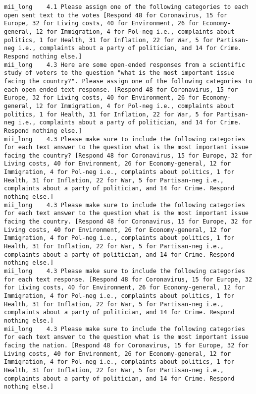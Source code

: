 \begin{lstlisting}[label=lst:promptvariants]
mii_long	4.1	Please assign one of the following categories to each open sent text to the votes [Respond 48 for Coronavirus, 15 for Europe, 32 for Living costs, 40 for Environment, 26 for Economy-general, 12 for Immigration, 4 for Pol-neg i.e., complaints about politics, 1 for Health, 31 for Inflation, 22 for War, 5 for Partisan-neg i.e., complaints about a party of politician, and 14 for Crime. Respond nothing else.]
mii_long	4.3	Here are some open-ended responses from a scientific study of voters to the question "what is the most important issue facing the country?". Please assign one of the following categories to each open ended text response. [Respond 48 for Coronavirus, 15 for Europe, 32 for Living costs, 40 for Environment, 26 for Economy-general, 12 for Immigration, 4 for Pol-neg i.e., complaints about politics, 1 for Health, 31 for Inflation, 22 for War, 5 for Partisan-neg i.e., complaints about a party of politician, and 14 for Crime. Respond nothing else.]
mii_long	4.3	Please make sure to include the following categories for each text answer to the question what is the most important issue facing the country? [Respond 48 for Coronavirus, 15 for Europe, 32 for Living costs, 40 for Environment, 26 for Economy-general, 12 for Immigration, 4 for Pol-neg i.e., complaints about politics, 1 for Health, 31 for Inflation, 22 for War, 5 for Partisan-neg i.e., complaints about a party of politician, and 14 for Crime. Respond nothing else.]
mii_long	4.3	Please make sure to include the following categories for each text answer to the question what is the most important issue facing the country. [Respond 48 for Coronavirus, 15 for Europe, 32 for Living costs, 40 for Environment, 26 for Economy-general, 12 for Immigration, 4 for Pol-neg i.e., complaints about politics, 1 for Health, 31 for Inflation, 22 for War, 5 for Partisan-neg i.e., complaints about a party of politician, and 14 for Crime. Respond nothing else.]
mii_long	4.3	Please make sure to include the following categories for each text response. [Respond 48 for Coronavirus, 15 for Europe, 32 for Living costs, 40 for Environment, 26 for Economy-general, 12 for Immigration, 4 for Pol-neg i.e., complaints about politics, 1 for Health, 31 for Inflation, 22 for War, 5 for Partisan-neg i.e., complaints about a party of politician, and 14 for Crime. Respond nothing else.]
mii_long	4.3	Please make sure to include the following categories for each text answer to the question what is the most important issue facing the nation. [Respond 48 for Coronavirus, 15 for Europe, 32 for Living costs, 40 for Environment, 26 for Economy-general, 12 for Immigration, 4 for Pol-neg i.e., complaints about politics, 1 for Health, 31 for Inflation, 22 for War, 5 for Partisan-neg i.e., complaints about a party of politician, and 14 for Crime. Respond nothing else.]

\end{lstlisting}

